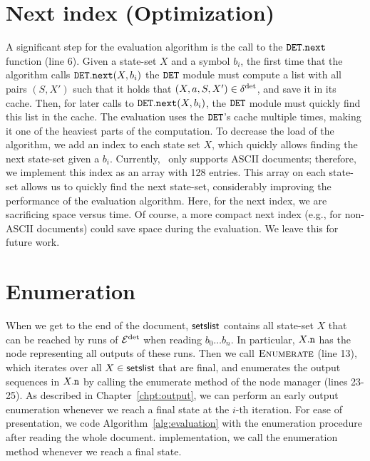 \section{Next index (Optimization)} 
A significant step for the evaluation algorithm is the call to the
$\mathtt{DET}.\texttt{next}$ function (line 6). Given a state-set $X$ and a symbol
$b_i$, the first time that the algorithm calls $\mathtt{DET}.\texttt{next}(X, b_i)$ the
$\mathtt{DET}$ module must compute a list with all pairs $(S, X')$ such that it holds
that $(X,a,S,X') \in \delta^{\operatorname{det}}$, and save it in its cache. Then, for later
calls to  $\mathtt{DET}.\texttt{next}(X, b_i)$, the $\mathtt{DET}$ module must quickly find
this list in the cache. The evaluation uses the $\mathtt{DET}$'s cache multiple times,
making it  one of the heaviest parts of the computation. To decrease the load of
the algorithm, we add an index to each state set $X$, which quickly allows
finding the next state-set given a $b_i$. Currently, \rematch\ only supports
ASCII documents; therefore, we implement this index as an array with 128
entries. This array on each state-set allows us to quickly find the next
state-set, considerably improving the performance of the evaluation algorithm.
Here, for the next index, we are sacrificing space versus time. Of course, a
more compact next index (e.g., for non-ASCII documents) could save space during
the evaluation. We leave this for future work. 

\section{Enumeration} 
When we get to the end of the document, $\textsf{setslist}$ contains all state-set
$X$ that can be reached by runs of $\mathcal{E}^{\operatorname{det}}$ when reading $b_0 \ldots b_n$. In
particular, $X.\mathtt{n}$ has the node representing all outputs of these runs. Then
we call $\textproc{Enumerate}$ (line 13), which iterates over all $X \in
\textsf{setslist}$ that are final, and enumerates the output sequences in $X.\mathtt{n}$
by calling the enumerate method of the node manager (lines 23-25).
%
As described in Chapter~\ref{chpt:output}, we can perform an early output
enumeration whenever we reach a final state at the $i$-th iteration. For ease of
presentation, we code Algorithm~\ref{alg:evaluation} with the enumeration
procedure after reading the whole document. %
implementation, we call the enumeration method whenever we reach a final state.


